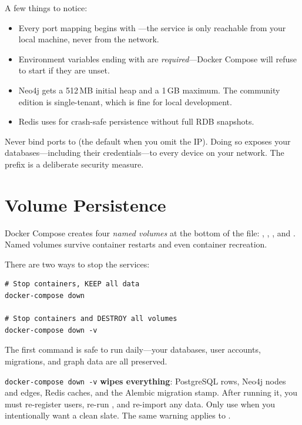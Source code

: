 A few things to notice:

\begin{itemize}
    \item Every port mapping begins with ---the service is only
          reachable from your local machine, never from the network.
    \item Environment variables ending with  are \emph{required}---Docker
          Compose will refuse to start if they are unset.
    \item Neo4j gets a 512\,MB initial heap and a 1\,GB maximum.  The
          community edition is single-tenant, which is fine for local
          development.
    \item Redis uses  for crash-safe persistence without
          full RDB snapshots.
\end{itemize}

\begin{warning}
Never bind ports to  (the default when you omit the IP).
Doing so exposes your databases---including their credentials---to every device
on your network.  The  prefix is a deliberate security measure.
\end{warning}


\section{Volume Persistence}
\label{sec:volume-persistence}

Docker Compose creates four \emph{named volumes} at the bottom of the file:
, , , and .
Named volumes survive container restarts and even container recreation.

There are two ways to stop the services:

\begin{lstlisting}[style=bash, numbers=none]
# Stop containers, KEEP all data
docker-compose down

# Stop containers and DESTROY all volumes
docker-compose down -v
\end{lstlisting}

The first command is safe to run daily---your databases, user accounts,
migrations, and graph data are all preserved.

\begin{warning}
\texttt{docker-compose down -v} \textbf{wipes everything}: PostgreSQL rows,
Neo4j nodes and edges, Redis caches, and the Alembic migration stamp.  After
running it, you must re-register users, re-run , and
re-import any data.  Only use  when you intentionally want a clean
slate.  The same warning applies to .
\end{warning}


